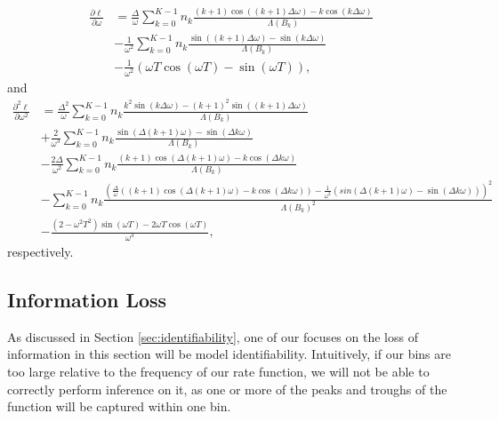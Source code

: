 \documentclass[11pt,a4,twosided,singlespacing,titlepagenumber=on,numbers=endperiod]{scrreprt}
\numberwithin{equation}{chapter} %
\theoremstyle{remark}
\begin{document}
\begin{equation*}
	\begin{aligned}
		\frac{\partial \ell}{\partial \omega} &= \frac{\Delta}{\omega} \sum_{k=0}^{K-1} n_k \frac{
			(k+1) \cos \left( (k+1) \Delta \omega \right) - k \cos (k \Delta \omega)
		}{
			\Lambda(B_k)
		} \\
		&- \frac{1}{\omega^2} \sum_{k=0}^{K-1} n_k \frac{
			\sin \left((k+1) \Delta \omega \right) - \sin(k \Delta \omega)
		}{
			\Lambda(B_k)
		}\\
		&- \frac{1}{\omega^2} \left( \omega T \cos(\omega T) - \sin(\omega T) \right)
		,
	\end{aligned}
\end{equation*}
and
\begin{equation*}
	\begin{aligned}
		\frac{\partial^2 \ell}{\partial \omega^2} &= \frac{\Delta^2}{\omega} \sum_{k=0}^{K-1} n_k \frac{
			k^2 \sin \left(k \Delta \omega \right) - (k+1)^2 \sin \left((k+1) \Delta \omega \right)
		}{
			\Lambda(B_k)
		} \\
		&+ \frac{2}{\omega^3} \sum_{k=0}^{K-1} n_k \frac{
			\sin \left(\Delta (k+1) \omega \right) - \sin(\Delta k \omega)
		}{
			\Lambda(B_k)
		} \\
		&- \frac{2 \Delta}{\omega^2}\sum_{k=0}^{K-1} n_k \frac{
			(k+1) \cos \left(\Delta (k+1) \omega \right) - k \cos (\Delta k \omega)
		}{
			\Lambda(B_k)
		}\\
		&- \sum_{k=0}^{K-1} n_k \frac{
			\left(
				\frac{\Delta}{\omega} \left((k+1) \cos(\Delta (k+1) \omega) - k \cos(\Delta k \omega) \right)
				- \frac{1}{\omega^2} \left( sin(\Delta (k+1) \omega) - \sin (\Delta k \omega) \right)
			\right) ^ 2
		}{
			\Lambda(B_k) ^ 2
		} \\
		&- \frac{(2 - \omega^2 T^2) \sin(\omega T) - 2 \omega T \cos(\omega T)}{\omega^3}
		,
	\end{aligned}
\end{equation*}
respectively.
\subsection{Information Loss}
As discussed in Section \ref{sec:identifiability}, one of our focuses on the loss of information in this section will be model identifiability. Intuitively, if our bins are too large relative to the frequency of our rate function, we will not be able to correctly perform inference on it, as one or more of the peaks and troughs of the function will be captured within one bin. 
\end{document}
